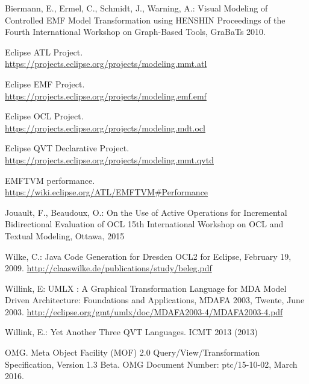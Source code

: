 \documentclass{llncs}
\begin{document}
%
%
\begin{thebibliography}{5}
Biermann, E., Ermel, C., Schmidt, J., Warning, A.:
Visual Modeling of Controlled EMF Model Transformation using HENSHIN
Proceedings of the Fourth International Workshop on Graph-Based Tools, GraBaTs 2010.

Eclipse ATL Project.\\
\url{https://projects.eclipse.org/projects/modeling.mmt.atl}

Eclipse EMF Project.\\
\url{https://projects.eclipse.org/projects/modeling.emf.emf}

Eclipse OCL Project.\\
\url{https://projects.eclipse.org/projects/modeling.mdt.ocl}

Eclipse QVT Declarative Project.\\
\url{https://projects.eclipse.org/projects/modeling.mmt.qvtd}

EMFTVM performance.\\
\url{https://wiki.eclipse.org/ATL/EMFTVM\#Performance}

Jouault, F., Beaudoux, O.:
On the Use of Active Operations for Incremental Bidirectional Evaluation of OCL
15th International Workshop on OCL and Textual Modeling, Ottawa, 2015

Wilke, C.: Java Code Generation for Dresden OCL2 for Eclipse, February 19, 2009.
\url{http://claaswilke.de/publications/study/beleg.pdf}

Willink, E: UMLX : A Graphical Transformation Language for MDA
Model Driven Architecture: Foundations and Applications, MDAFA 2003, Twente, June 2003.
\url{http://eclipse.org/gmt/umlx/doc/MDAFA2003-4/MDAFA2003-4.pdf}

Willink, E.:
Yet Another Three QVT Languages.
ICMT 2013 (2013)

OMG. Meta Object Facility (MOF) 2.0 Query/View/Transformation Specification, Version 1.3 Beta.
OMG Document Number: ptc/15-10-02, March 2016.
\end{thebibliography}
\end{document}
